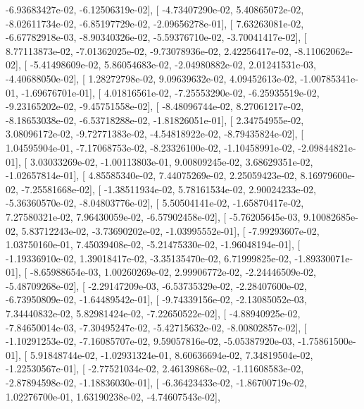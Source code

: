 \documentclass{article}
\begin{document}
         -6.93683427e-02,  -6.12506319e-02],
       [ -4.73407290e-02,   5.40865072e-02,  -8.02611734e-02,
         -6.85197729e-02,  -2.09656278e-01],
       [  7.63263081e-02,  -6.67782918e-03,  -8.90340326e-02,
         -5.59376710e-02,  -3.70041417e-02],
       [  8.77113873e-02,  -7.01362025e-02,  -9.73078936e-02,
          2.42256417e-02,  -8.11062062e-02],
       [ -5.41498609e-02,   5.86054683e-02,  -2.04980882e-02,
          2.01241531e-03,  -4.40688050e-02],
       [  1.28272798e-02,   9.09639632e-02,   4.09452613e-02,
         -1.00785341e-01,  -1.69676701e-01],
       [  4.01816561e-02,  -7.25553290e-02,  -6.25935519e-02,
         -9.23165202e-02,  -9.45751558e-02],
       [ -8.48096744e-02,   8.27061217e-02,  -8.18653038e-02,
         -6.53718288e-02,  -1.81826051e-01],
       [  2.34754955e-02,   3.08096172e-02,  -9.72771383e-02,
         -4.54818922e-02,  -8.79435824e-02],
       [  1.04595904e-01,  -7.17068753e-02,  -8.23326100e-02,
         -1.10458991e-02,  -2.09844821e-01],
       [  3.03033269e-02,  -1.00113803e-01,   9.00809245e-02,
          3.68629351e-02,  -1.02657814e-01],
       [  4.85585340e-02,   7.44075269e-02,   2.25059423e-02,
          8.16979600e-02,  -7.25581668e-02],
       [ -1.38511934e-02,   5.78161534e-02,   2.90024233e-02,
         -5.36360570e-02,  -8.04803776e-02],
       [  5.50504141e-02,  -1.65870417e-02,   7.27580321e-02,
          7.96430059e-02,  -6.57902458e-02],
       [ -5.76205645e-03,   9.10082685e-02,   5.83712243e-02,
         -3.73690202e-02,  -1.03995552e-01],
       [ -7.99293607e-02,   1.03750160e-01,   7.45039408e-02,
         -5.21475330e-02,  -1.96048194e-01],
       [ -1.19336910e-02,   1.39018417e-02,  -3.35135470e-02,
          6.71999825e-02,  -1.89330071e-01],
       [ -8.65988654e-03,   1.00260269e-02,   2.99906772e-02,
         -2.24446509e-02,  -5.48709268e-02],
       [ -2.29147209e-03,  -6.53735329e-02,  -2.28407600e-02,
         -6.73950809e-02,  -1.64489542e-01],
       [ -9.74339156e-02,  -2.13085052e-03,   7.34440832e-02,
          5.82981424e-02,  -7.22650522e-02],
       [ -4.88940925e-02,  -7.84650014e-03,  -7.30495247e-02,
         -5.42715632e-02,  -8.00802857e-02],
       [ -1.10291253e-02,  -7.16085707e-02,   9.59057816e-02,
         -5.05387920e-03,  -1.75861500e-01],
       [  5.91848744e-02,  -1.02931324e-01,   8.60636694e-02,
          7.34819504e-02,  -1.22530567e-01],
       [ -2.77521034e-02,   2.46139868e-02,  -1.11608583e-02,
         -2.87894598e-02,  -1.18836030e-01],
       [ -6.36423433e-02,  -1.86700719e-02,   1.02276700e-01,
          1.63190238e-02,  -4.74607543e-02],
\end{document}
